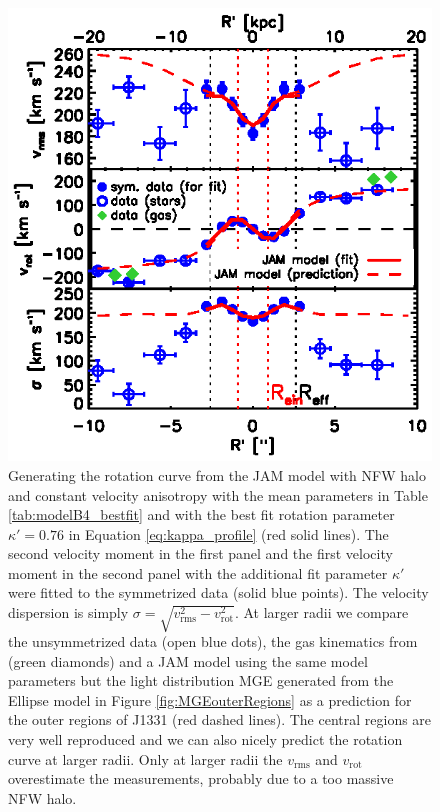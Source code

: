 \begin{figure}
\centering
\includegraphics[width=\linewidth]{fig/B4_rms_rot_curves_best_model.ps}
\caption{Generating the rotation curve from the JAM model with NFW halo and constant velocity anisotropy with the mean parameters in Table \ref{tab:modelB4_bestfit} and with the best fit rotation parameter $\kappa' = 0.76$ in Equation \eqref{eq:kappa_profile} (red solid lines). The second velocity moment in the first panel and the first velocity moment in the second panel with the additional fit parameter $\kappa'$ were fitted to the symmetrized data (solid blue points). The velocity dispersion is simply $\sigma = \sqrt{v_\text{rms}^2 - v_\text{rot}^2}$. At larger radii we compare the unsymmetrized data (open blue dots), the gas kinematics from \citet{SWELLSV} (green diamonds) and a JAM model using the same model parameters but the light distribution MGE generated from the Ellipse model in Figure \ref{fig:MGEouterRegions} as a prediction for the outer regions of J1331 (red dashed lines). The central regions are very well reproduced and we can also nicely predict the rotation curve at larger radii. Only at larger radii the $v_\text{rms}$ and $v_\text{rot}$ overestimate the measurements, probably due to a too massive NFW halo. }
\label{fig:modelB4_vrot}
\end{figure}


